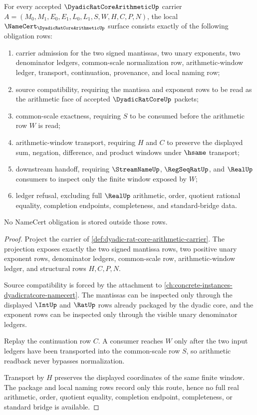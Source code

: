 \begin{theorem}
\label{thm:dyadic-rat-core-arithmetic-namecert-obligations}
For every accepted $\DyadicRatCoreArithmeticUp$ carrier $A=(M_0,M_1,E_0,E_1,L_0,L_1,S,W,H,C,P,N)$, the local $\NameCert_{\DyadicRatCoreArithmeticUp}$ surface consists exactly of the following obligation rows:
\begin{enumerate}
\item carrier admission for the two signed mantissas, two unary exponents, two denominator ledgers, common-scale normalization row, arithmetic-window ledger, transport, continuation, provenance, and local naming row;
\item source compatibility, requiring the mantissa and exponent rows to be read as the arithmetic face of accepted $\DyadicRatCoreUp$ packets;
\item common-scale exactness, requiring $S$ to be consumed before the arithmetic row $W$ is read;
\item arithmetic-window transport, requiring $H$ and $C$ to preserve the displayed sum, negation, difference, and product windows under $\hsame$ transport;
\item downstream handoff, requiring $\StreamNameUp$, $\RegSeqRatUp$, and $\RealUp$ consumers to inspect only the finite window exposed by $W$;
\item ledger refusal, excluding full $\RealUp$ arithmetic, order, quotient rational equality, completion endpoints, completeness, and standard-bridge data.
\end{enumerate}
No NameCert obligation is stored outside those rows.
\end{theorem}
\begin{proof}
Project the carrier of \autoref{def:dyadic-rat-core-arithmetic-carrier}. The projection exposes exactly the two signed mantissa rows, two positive unary exponent rows, denominator ledgers, common-scale row, arithmetic-window ledger, and structural rows $H,C,P,N$.

Source compatibility is forced by the attachment to \autoref{ch:concrete-instances-dyadicratcore-namecert}. The mantissas can be inspected only through the displayed $\IntUp$ and $\RatUp$ rows already packaged by the dyadic core, and the exponent rows can be inspected only through the visible unary denominator ledgers.

Replay the continuation row $C$. A consumer reaches $W$ only after the two input ledgers have been transported into the common-scale row $S$, so arithmetic readback never bypasses normalization.

Transport by $H$ preserves the displayed coordinates of the same finite window. The package and local naming rows record only this route, hence no full real arithmetic, order, quotient equality, completion endpoint, completeness, or standard bridge is available.
\end{proof}

